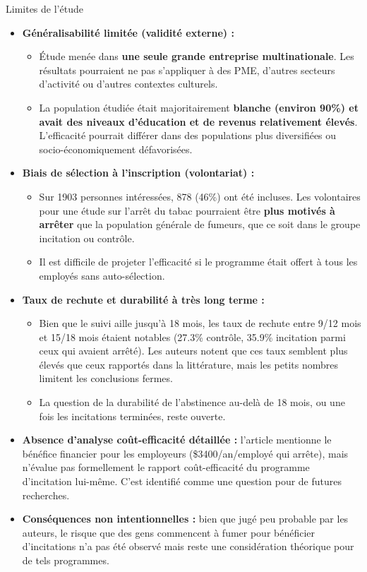 \documentclass[aspectratio=169,xcolor=dvipsnames]{beamer}
\begin{document}
\begin{frame}{Limites de l'étude}
    \begin{itemize}
        \item \textbf{Généralisabilité limitée (validité externe) :}
            \begin{itemize}
                \item Étude menée dans \textbf{une seule grande entreprise multinationale}. Les résultats pourraient ne pas s'appliquer à des PME, d'autres secteurs d'activité ou d'autres contextes culturels.
                \item La population étudiée était majoritairement \textbf{blanche (environ 90\%) et avait des niveaux d'éducation et de revenus relativement élevés}. L'efficacité pourrait différer dans des populations plus diversifiées ou socio-économiquement défavorisées.
            \end{itemize}
        \item \textbf{Biais de sélection à l'inscription (volontariat) :}
            \begin{itemize}
                \item Sur 1903 personnes intéressées, 878 (46\%) ont été incluses. Les volontaires pour une étude sur l'arrêt du tabac pourraient être \textbf{plus motivés à arrêter} que la population générale de fumeurs, que ce soit dans le groupe incitation ou contrôle.
                \item Il est difficile de projeter l'efficacité si le programme était offert à tous les employés sans auto-sélection.
            \end{itemize}
        \item \textbf{Taux de rechute et durabilité à très long terme :}
            \begin{itemize}
                \item Bien que le suivi aille jusqu'à 18 mois, les taux de rechute entre 9/12 mois et 15/18 mois étaient notables (27.3\% contrôle, 35.9\% incitation parmi ceux qui avaient arrêté). Les auteurs notent que ces taux semblent plus élevés que ceux rapportés dans la littérature, mais les petits nombres limitent les conclusions fermes.
                \item La question de la durabilité de l'abstinence au-delà de 18 mois, ou une fois les incitations terminées, reste ouverte.
            \end{itemize}
        \item \textbf{Absence d'analyse coût-efficacité détaillée :} l'article mentionne le bénéfice financier pour les employeurs (\$3400/an/employé qui arrête), mais n'évalue pas formellement le rapport coût-efficacité du programme d'incitation lui-même. C'est identifié comme une question pour de futures recherches.
        \item \textbf{Conséquences non intentionnelles :} bien que jugé peu probable par les auteurs, le risque que des gens commencent à fumer pour bénéficier d'incitations n'a pas été observé mais reste une considération théorique pour de tels programmes.
    \end{itemize}
\end{frame}
\end{document}
